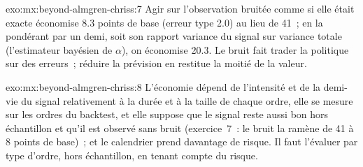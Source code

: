 \begin{solution}{exo:mx:beyond-almgren-chriss:7}
Agir sur l'observation bruitée comme si elle était exacte économise 8.3 points de base (erreur type 2.0) au lieu de 41~; en la pondérant par un demi, soit son rapport variance du signal sur variance totale
(l'estimateur bayésien de $\alpha$), on économise 20.3. Le bruit fait trader la politique sur des erreurs~; réduire la prévision en restitue la moitié de la valeur.
\end{solution}

\begin{solution}{exo:mx:beyond-almgren-chriss:8}
L'économie dépend de l'intensité et de la demi-vie du signal relativement à la durée et à la taille de chaque ordre, elle se mesure sur les ordres du backtest, et elle
suppose que le signal reste aussi bon hors échantillon et qu'il est observé sans bruit (exercice~7~: le bruit la ramène de 41 à 8 points de base)~; et le calendrier prend davantage de risque.
Il faut l'évaluer par type d'ordre, hors échantillon, en tenant compte du risque.
\end{solution}

